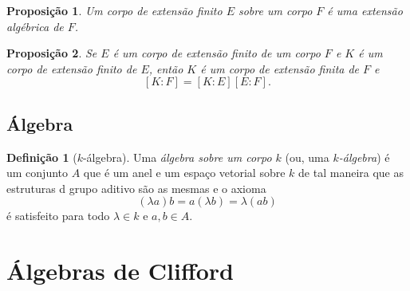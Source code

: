 \documentclass[a4paper,12pt]{report}
\theoremstyle{plain}
\newtheorem{proposicao}{Proposição}[section]
\theoremstyle{definition}
\newtheorem{definicao}{Definição}[section]
\begin{document}
\begin{proposicao}
	Um corpo de extensão finito $E$ sobre um corpo $F$ é uma extensão algébrica de $F$.
\end{proposicao}

\begin{proposicao}
	Se $E$ é um corpo de extensão finito de um corpo $F$ e $K$ é um corpo de extensão finito de $E$, então $K$ é um corpo de extensão finita de $F$ e $$[K:F] = [K:E][E:F].$$	
\end{proposicao}

\section{Álgebra}

\begin{definicao}[$k$-álgebra]
	Uma \emph{álgebra sobre um corpo $k$} (ou, uma \emph{$k$-álgebra}) é um conjunto $A$ que é um anel e um espaço vetorial sobre $k$ de tal maneira que as estruturas d grupo aditivo são as mesmas e o axioma $$(\lambda a)b = a(\lambda b) = \lambda(ab)$$ é satisfeito para todo $\lambda\in k$ e $a,b \in A$.
\end{definicao}

\chapter{Álgebras de Clifford}



{}



\end{document}
